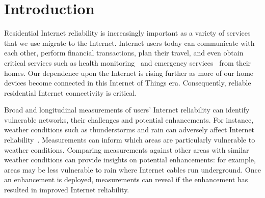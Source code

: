

\chapter{Introduction}







Residential Internet reliability is increasingly important as a variety of
services that we use migrate to the Internet. Internet users today can
communicate with each other, perform financial transactions, plan
their travel, and even obtain critical services such as health
monitoring~\cite{ideal-life, remote-health-elderly} and emergency
services~\cite{emergency-voip-voipfone, emergency-voip-fcc} from their
homes. Our dependence upon the Internet is rising further as more of
our home devices become connected in this Internet of Things
era. Consequently, reliable residential Internet connectivity is critical.

Broad and longitudinal measurements of users' Internet reliability can identify vulnerable networks, their
challenges and potential enhancements. For instance, weather conditions such as
thunderstorms and rain can adversely affect Internet
reliability~\cite{pingin}. Measurements can inform which areas are
particularly vulnerable to weather conditions. Comparing measurements
against other areas with similar weather conditions can provide
insights on potential enhancements: for example, areas may be less
vulnerable to rain where Internet cables run underground. Once an
enhancement is deployed, measurements can reveal if the enhancement
has resulted in improved Internet reliability.

